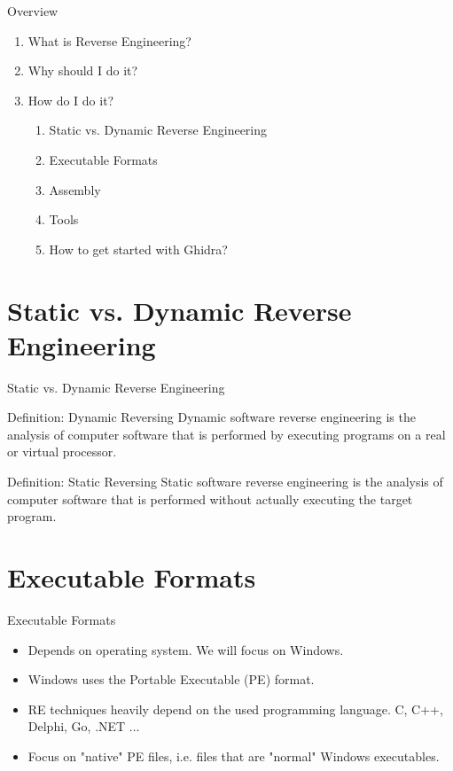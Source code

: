\documentclass{beamer}
\begin{document}
  \begin{frame}{Overview}
    \begin{enumerate}
      \item What is Reverse Engineering?
      \item Why should I do it?
      \item How do I do it?
      \pause
      \begin{enumerate}
        \item Static vs. Dynamic Reverse Engineering
        \item Executable Formats
        \item Assembly
        \item Tools
        \item How to get started with Ghidra?
      \end{enumerate}
    \end{enumerate}
  \end{frame}

  \section{Static vs. Dynamic Reverse Engineering}
  \begin{frame}{Static vs. Dynamic Reverse Engineering}\pause
    \begin{alertblock}{Definition: Dynamic Reversing}
      Dynamic software reverse engineering is the analysis of computer software that is performed
      by executing programs on a real or virtual processor.
    \end{alertblock}\pause
    \begin{alertblock}{Definition: Static Reversing}
      Static software reverse engineering is the analysis of computer software that is performed
      without actually executing the target program.
    \end{alertblock}
  \end{frame}

  \section{Executable Formats}
  \begin{frame}{Executable Formats}
    \begin{itemize}
      \item Depends on operating system\pause. We will focus on Windows.\pause
      \item Windows uses the Portable Executable (PE) format.\pause
      \item RE techniques heavily depend on the used programming language. C, C++, Delphi, Go, .NET $\ldots$\pause
      \item Focus on "native" PE files, i.e. files that are "normal" Windows executables.
    \end{itemize}
  \end{frame}
\end{document}

